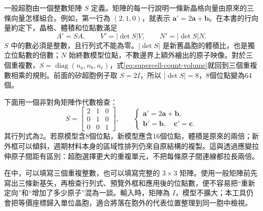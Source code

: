 一般超胞由一個整數矩陣 $S$ 定義。矩陣的每一行說明一條新晶格向量由原來的三條向量怎樣組合。例如，第一行為 $(2,1,0)$，就表示 $\mathbf a'=2\mathbf a+\mathbf b$。在本書的行向量約定下，晶格、體積和位點數滿足
\begin{equation}
 A'=SA,\qquad V'=|\det S|V,\qquad N'=|\det S|N.
 \label{eq:supercell-count-volume}
\end{equation}
$S$ 中的數必須是整數，且行列式不能為零。$|\det S|$ 是新舊晶胞的體積比，也是獨立位點數的倍數；$N$ 始終數模型位點，不數邊界上額外繪出的原子映像。對於三個重複數，$S=\operatorname{diag}(n_a,n_b,n_c)$，式\eqref{eq:supercell-count-volume}就回到三個重複數相乘的規則。前面的矽超胞例子取 $S=2I$，所以 $|\det S|=8$，8個位點變為64個。

下面用一個非對角矩陣作代數檢查：
\[
 S=\begin{bmatrix}2&1&0\\0&1&0\\0&0&1\end{bmatrix},\qquad
 \begin{cases}
 \mathbf a'=2\mathbf a+\mathbf b,\\
 \mathbf b'=\mathbf b,\quad \mathbf c'=\mathbf c.
 \end{cases}
\]
其行列式為2。若原模型含8個位點，新模型應含16個位點，體積是原來的兩倍；新外框可以傾斜，週期材料本身的區域性排列仍來自原結構的複製。這與透過應變拉伸原子間距有區別：超胞選擇更大的重複單元，不把每條原子間連線都拉長兩倍。

在中，可以填寫三個重複整數，也可以填寫完整的 $3\times3$ 矩陣。使用一般矩陣前先寫出三條新基矢，再檢查行列式、預覽外框和應用後的位點數，便不容易把“重新定向”和“增加了多少原子”混為一談。輸入時，矩陣為 $I$，模型不擴大；本工具仍會把等價座標歸入單位晶胞，適合將落在胞外的代表位置整理到同一胞中檢視。
